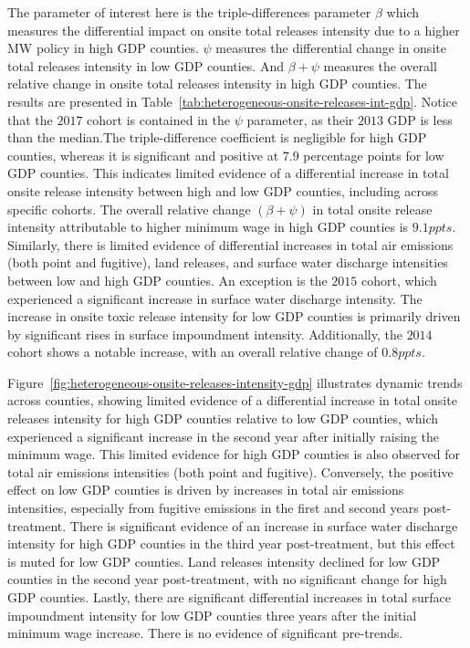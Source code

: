 \documentclass[12pt, english]{article}
\begin{document}
    The parameter of interest here is the triple-differences parameter $\beta$ which measures the differential impact on onsite total releases intensity due to a higher MW policy in high GDP counties. $\psi$ measures the differential change in onsite total releases intensity in low GDP counties. And $\beta + \psi$ measures the overall relative change in onsite total releases intensity in high GDP counties. The results are presented in Table~\ref{tab:heterogeneous-onsite-releases-int-gdp}. Notice that the $2017$ cohort is contained in the $\psi$ parameter, as their $2013$ GDP is less than the median.The triple-difference coefficient is negligible for high GDP counties, whereas it is significant and positive at $7.9$ percentage points for low GDP counties. This indicates limited evidence of a differential increase in total onsite release intensity between high and low GDP counties, including across specific cohorts. The overall relative change $(\beta + \psi)$ in total onsite release intensity attributable to higher minimum wage in high GDP counties is $9.1ppts$. Similarly, there is limited evidence of differential increases in total air emissions (both point and fugitive), land releases, and surface water discharge intensities between low and high GDP counties. An exception is the $2015$ cohort, which experienced a significant increase in surface water discharge intensity. The increase in onsite toxic release intensity for low GDP counties is primarily driven by significant rises in surface impoundment intensity. Additionally, the $2014$ cohort shows a notable increase, with an overall relative change of $0.8ppts$.
    

    Figure~\ref{fig:heterogeneous-onsite-releases-intensity-gdp} illustrates dynamic trends across counties, showing limited evidence of a differential increase in total onsite releases intensity for high GDP counties relative to low GDP counties, which experienced a significant increase in the second year after initially raising the minimum wage. This limited evidence for high GDP counties is also observed for total air emissions intensities (both point and fugitive). Conversely, the positive effect on low GDP counties is driven by increases in total air emissions intensities, especially from fugitive emissions in the first and second years post-treatment. There is significant evidence of an increase in surface water discharge intensity for high GDP counties in the third year post-treatment, but this effect is muted for low GDP counties. Land releases intensity declined for low GDP counties in the second year post-treatment, with no significant change for high GDP counties. Lastly, there are significant differential increases in total surface impoundment intensity for low GDP counties three years after the initial minimum wage increase. There is no evidence of significant pre-trends.
\end{document}
